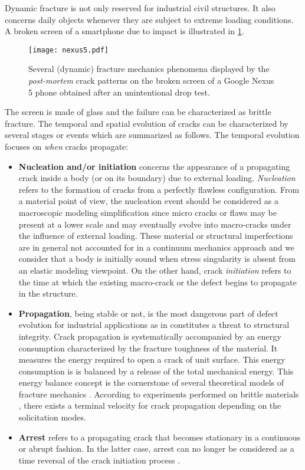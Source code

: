 Dynamic fracture is not only reserved for industrial civil structures. It also concerns daily objects whenever they are subject to extreme loading conditions. A broken screen of a smartphone due to impact is illustrated in \cref{fig:nexus5}.
\begin{figure}[htbp]
\centering
\texttt{[image: nexus5.pdf]}
\caption{Several (dynamic) fracture mechanics phenomena displayed by the \emph{post-mortem} crack patterns on the broken screen of a Google Nexus 5 phone obtained after an unintentional drop test.} \label{fig:nexus5}
\end{figure}
The screen is made of glass and the failure can be characterized as brittle fracture. The temporal and spatial evolution of cracks can be characterized by several stages or events which are summarized as follows. The temporal evolution focuses on \emph{when} cracks propagate:
\begin{itemize}
\item \textbf{Nucleation and/or initiation} concerns the appearance of a propagating crack inside a body (or on its boundary) due to external loading. \emph{Nucleation} refers to the formation of cracks from a perfectly flawless configuration. From a material point of view, the nucleation event should be considered as a macroscopic modeling simplification since micro cracks or flaws may be present at a lower scale and may eventually evolve into macro-cracks under the influence of external loading. These material or structural imperfections are in general not accounted for in a continuum mechanics approach and we consider that a body is initially sound when stress singularity is absent from an elastic modeling viewpoint. On the other hand, crack \emph{initiation} refers to the time at which the existing macro-crack or the defect begins to propagate in the structure.

\item \textbf{Propagation}, being stable or not, is
the most dangerous part of defect evolution for industrial applications as in constitutes a threat to structural integrity. Crack propagation is systematically accompanied by an energy consumption characterized by the fracture toughness of the material. It measures the energy required to open a crack of unit surface. This energy consumption is is balanced by a release of the total mechanical energy. This energy balance concept is the cornerstone of several theoretical models of fracture mechanics \cite{Griffith:1921,Mott:1947}. According to experiments performed on brittle materials \cite{Ravi-ChandarKnauss:1984a}, there exists a terminal velocity for crack propagation depending on the solicitation modes.

\item \textbf{Arrest} refers to a propagating crack that becomes stationary in a continuous or abrupt fashion. In the latter case, arrest can no longer be considered as a time reversal of the crack initiation process \cite{Ravi-ChandarKnauss:1984c}.
\end{itemize}

